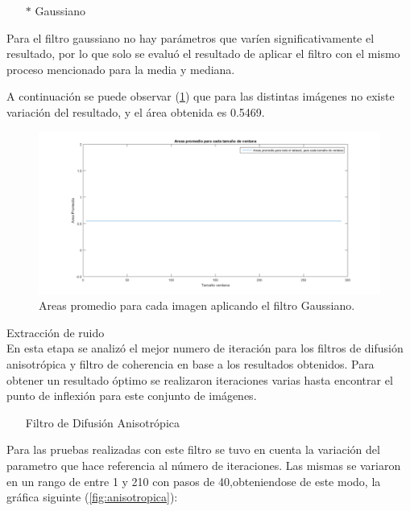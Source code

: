 \begin{itemize}
	\item[$*$]Gaussiano
\end{itemize}

Para el filtro gaussiano no hay parámetros que varíen significativamente el resultado, por lo que solo se evaluó el resultado de aplicar el filtro con el mismo proceso mencionado para la media y mediana. 

A continuaci\'on se puede observar (\ref{fig:gaussiano}) que para las distintas imágenes no existe variación del resultado, y el área obtenida es 0.5469.


\begin{figure}[H]
	{
	\centering
	\includegraphics[width=1\textwidth]{Figures/Gaussiano}
	\caption[An Electron]{Areas promedio para cada imagen aplicando el filtro Gaussiano.}
	\label{fig:gaussiano}
	}
\end{figure}

Extracci\'on de ruido\\

En esta etapa se analiz\'o el mejor numero de iteraci\'on para los filtros de difusi\'on anisotr\'opica y filtro de coherencia en base a los resultados obtenidos. Para obtener un resultado \'optimo se realizaron iteraciones varias hasta encontrar el punto de inflexi\'on para este conjunto de im\'agenes.\\


\begin{itemize}
	\item[]Filtro de Difusi\'on Anisotr\'opica
\end{itemize}

Para las pruebas realizadas con este filtro se tuvo en cuenta la variaci\'on del parametro que hace referencia al n\'umero de iteraciones. Las mismas se variaron en un rango de entre 1 y 210 con pasos de 40,obteniendose de este modo, la gr\'afica siguinte (\ref{fig:anisotropica}):

